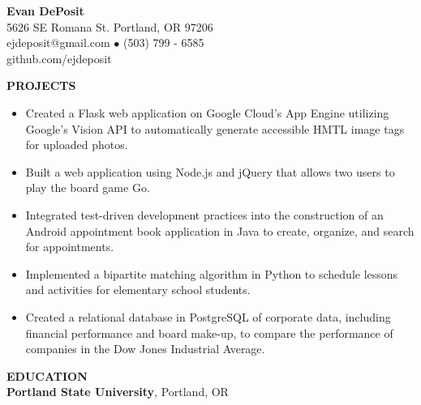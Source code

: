 \documentclass[10 pt]{article}
\begin{document}
\thispagestyle{empty}
\begin{center}
\noindent \Large{\textbf{Evan DePosit}}\\
\large{5626 SE Romana St. Portland, OR 97206}\\
\large{ejdeposit@gmail.com $\bullet$ (503) 799 - 6585}\\
\large{github.com/ejdeposit}
\end{center}
\bigskip

\noindent
\makebox[0pt][l]{\rule[-.2\baselineskip]{\linewidth}{.3mm}}%
\large{\textbf{PROJECTS}}
%
\begin{itemize}[leftmargin=*, itemsep=0pt, topsep=5pt]
	\item Created a Flask web application on Google Cloud’s App Engine utilizing Google’s Vision API to automatically generate accessible HMTL image tags for uploaded photos.
	\item Built a web application using Node.js and jQuery that allows two users to play the board game Go.
	\item Integrated test-driven development practices into the construction of an Android appointment book application in Java to create, organize, and search for appointments.
	\item Implemented a bipartite matching algorithm in Python to schedule lessons and activities for elementary school students.
	\item Created a relational database in PostgreSQL of corporate data, including financial performance and board make-up, to compare the performance of companies in the Dow Jones Industrial Average.
\end{itemize}
\bigbreak \noindent
%
\makebox[0pt][l]{\rule[-.2\baselineskip]{\linewidth}{.3mm}}%
\large{\textbf{EDUCATION}} \smallskip \\
%
\textbf{Portland State University}, Portland, OR\\
\end{document}
